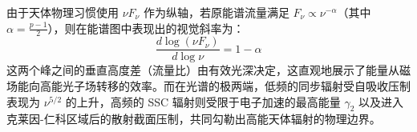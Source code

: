 
由于天体物理习惯使用 $\nu F_\nu$ 作为纵轴，若原能谱流量满足 $F_\nu \propto \nu^{-\alpha}$（其中 $\alpha = \frac{p-1}{2}$），则在能谱图中表现出的视觉斜率为：
\begin{equation}
    \frac{d \log (\nu F_\nu)}{d \log \nu} = 1 - \alpha
\end{equation}
这两个峰之间的垂直高度差（流量比）由有效光深决定，这直观地展示了能量从磁场能向高能光子场转移的效率。而在光谱的极两端，低频的同步辐射受自吸收压制表现为 $\nu^{5/2}$ 的上升，高频的 SSC 辐射则受限于电子加速的最高能量 $\gamma_2$ 以及进入克莱因-仁科区域后的散射截面压制，共同勾勒出高能天体辐射的物理边界。
